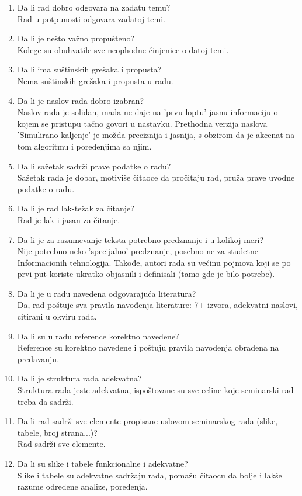 \documentclass[a4paper]{report}
\begin{document}
\begin{enumerate}
\item Da li rad dobro odgovara na zadatu temu?\\
Rad u potpunosti odgovara zadatoj temi.
\item Da li je nešto važno propušteno?\\
Kolege su obuhvatile sve neophodne činjenice o datoj temi.
\item Da li ima suštinskih grešaka i propusta?\\
Nema suštinskih grešaka i propusta u radu.
\item Da li je naslov rada dobro izabran?\\
Naslov rada je solidan, mada ne daje na 'prvu loptu' jasnu informaciju o kojem se pristupu tačno govori u nastavku. Prethodna verzija naslova 'Simulirano kaljenje' je možda preciznija i jasnija, s obzirom da je akcenat na tom algoritmu i poređenjima sa njim.
\item Da li sažetak sadrži prave podatke o radu?\\
Sažetak rada je dobar, motiviše čitaoce da pročitaju rad, pruža prave uvodne podatke o radu.
\item Da li je rad lak-težak za čitanje?\\
Rad je lak i jasan za čitanje.
\item Da li je za razumevanje teksta potrebno predznanje i u kolikoj meri?\\
Nije potrebno neko 'specijalno' predznanje, posebno ne za studetne Informacionih tehnologija. Takođe, autori rada su većinu pojmova koji se po prvi put koriste ukratko objasnili i definisali (tamo gde je bilo potrebe).
\item Da li je u radu navedena odgovarajuća literatura?\\
Da, rad poštuje sva pravila navođenja literature: 7+ izvora, adekvatni naslovi, citirani u okviru rada.
\item Da li su u radu reference korektno navedene?\\
Reference su korektno navedene i poštuju pravila navođenja obrađena na predavanju.
\item Da li je struktura rada adekvatna?\\
Struktura rada jeste adekvatna, ispoštovane su sve celine koje seminarski rad treba da sadrži.
\item Da li rad sadrži sve elemente propisane uslovom seminarskog rada (slike, tabele, broj strana...)?\\
Rad sadrži sve elemente.
\item Da li su slike i tabele funkcionalne i adekvatne?\\
Slike i tabele su adekvatne sadržaju rada, pomažu čitaocu da bolje i lakše razume određene analize, poređenja.
\end{enumerate}
\end{document}
